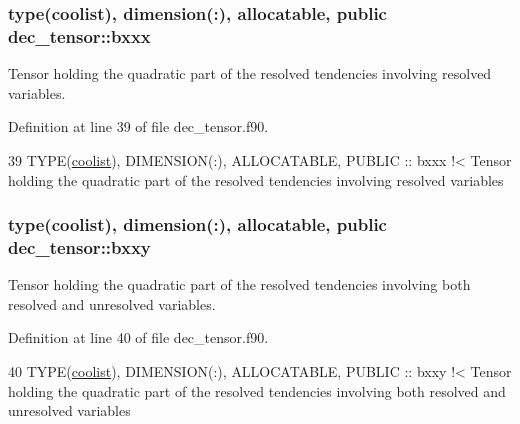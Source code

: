 \subsubsection[{\texorpdfstring{bxxx}{bxxx}}]{\setlength{\rightskip}{0pt plus 5cm}type({\bf coolist}), dimension(\+:), allocatable, public dec\+\_\+tensor\+::bxxx}\hypertarget{namespacedec__tensor_ad4649ed646f1d4cdb0997880e4f39969}{}\label{namespacedec__tensor_ad4649ed646f1d4cdb0997880e4f39969}


Tensor holding the quadratic part of the resolved tendencies involving resolved variables. 



Definition at line 39 of file dec\+\_\+tensor.\+f90.


\begin{DoxyCode}
39   \textcolor{keywordtype}{TYPE}(\hyperlink{structtensor_1_1coolist}{coolist}), \textcolor{keywordtype}{DIMENSION(:)}, \textcolor{keywordtype}{ALLOCATABLE}, \textcolor{keywordtype}{PUBLIC} :: bxxx\textcolor{comment}{ !< Tensor holding the quadratic part of
       the resolved tendencies involving resolved variables}
\end{DoxyCode}
\subsubsection[{\texorpdfstring{bxxy}{bxxy}}]{\setlength{\rightskip}{0pt plus 5cm}type({\bf coolist}), dimension(\+:), allocatable, public dec\+\_\+tensor\+::bxxy}\hypertarget{namespacedec__tensor_ad451ae880f34cc385482e33b45070dcd}{}\label{namespacedec__tensor_ad451ae880f34cc385482e33b45070dcd}


Tensor holding the quadratic part of the resolved tendencies involving both resolved and unresolved variables. 



Definition at line 40 of file dec\+\_\+tensor.\+f90.


\begin{DoxyCode}
40   \textcolor{keywordtype}{TYPE}(\hyperlink{structtensor_1_1coolist}{coolist}), \textcolor{keywordtype}{DIMENSION(:)}, \textcolor{keywordtype}{ALLOCATABLE}, \textcolor{keywordtype}{PUBLIC} :: bxxy\textcolor{comment}{ !< Tensor holding the quadratic part of
       the resolved tendencies involving both resolved and unresolved variables}
\end{DoxyCode}
